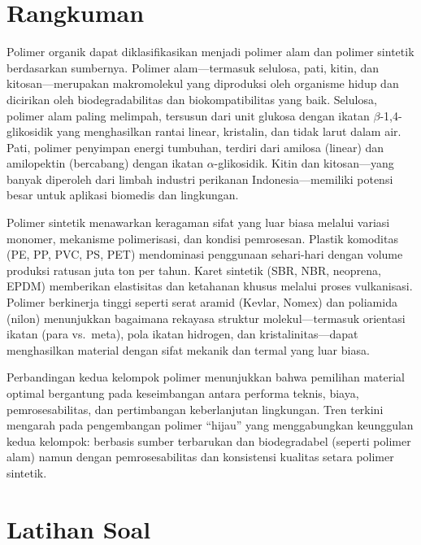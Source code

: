 \documentclass[12pt,a4paper,openany]{book}
\begin{document}
\section{Rangkuman}
\label{sec:rangkuman-bab2}

Polimer organik dapat diklasifikasikan menjadi polimer alam dan polimer sintetik berdasarkan sumbernya. Polimer alam---termasuk selulosa, pati, kitin, dan kitosan---merupakan makromolekul yang diproduksi oleh organisme hidup dan dicirikan oleh biodegradabilitas dan biokompatibilitas yang baik. Selulosa, polimer alam paling melimpah, tersusun dari unit glukosa dengan ikatan $\beta$-1,4-glikosidik yang menghasilkan rantai linear, kristalin, dan tidak larut dalam air. Pati, polimer penyimpan energi tumbuhan, terdiri dari amilosa (linear) dan amilopektin (bercabang) dengan ikatan $\alpha$-glikosidik. Kitin dan kitosan---yang banyak diperoleh dari limbah industri perikanan Indonesia---memiliki potensi besar untuk aplikasi biomedis dan lingkungan.

Polimer sintetik menawarkan keragaman sifat yang luar biasa melalui variasi monomer, mekanisme polimerisasi, dan kondisi pemrosesan. Plastik komoditas (PE, PP, PVC, PS, PET) mendominasi penggunaan sehari-hari dengan volume produksi ratusan juta ton per tahun. Karet sintetik (SBR, NBR, neoprena, EPDM) memberikan elastisitas dan ketahanan khusus melalui proses vulkanisasi. Polimer berkinerja tinggi seperti serat aramid (Kevlar, Nomex) dan poliamida (nilon) menunjukkan bagaimana rekayasa struktur molekul---termasuk orientasi ikatan (para vs.\ meta), pola ikatan hidrogen, dan kristalinitas---dapat menghasilkan material dengan sifat mekanik dan termal yang luar biasa.

Perbandingan kedua kelompok polimer menunjukkan bahwa pemilihan material optimal bergantung pada keseimbangan antara performa teknis, biaya, pemrosesabilitas, dan pertimbangan keberlanjutan lingkungan. Tren terkini mengarah pada pengembangan polimer ``hijau'' yang menggabungkan keunggulan kedua kelompok: berbasis sumber terbarukan dan biodegradabel (seperti polimer alam) namun dengan pemrosesabilitas dan konsistensi kualitas setara polimer sintetik.

\section{Latihan Soal}
\label{sec:latihan-bab2}
\end{document}

